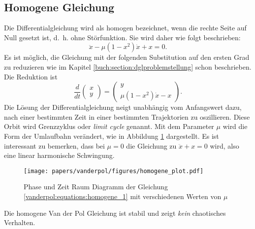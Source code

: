 \subsection{Homogene Gleichung
\label{vanderpol:subsection:homogene}}
%
Die Differentialgleichung wird als homogen bezeichnet, wenn die rechte Seite auf Null gesetzt ist, d.~h. ohne Störfunktion. Sie wird daher wie folgt beschrieben:
%
\begin{equation}
	\ddot{x} - \mu \left(1-x^{2}\right)\dot{x}+x = 0.
\label{vanderpol:equations:homogene}
\end{equation}
Es ist möglich, die Gleichung mit der folgenden Substitution auf den ersten Grad zu reduzieren wie im Kapitel \ref{buch:section:dglproblemstellung} schon beschrieben. Die Reduktion ist
%
\begin{equation}
\frac{d}{dt}\begin{pmatrix}x \\ y\end{pmatrix} = \begin{pmatrix}y \\ \mu \left(1-x^{2}\right)\dot{x}-x\end{pmatrix}.
\label{vanderpol:equations:homogene_1}
\end{equation}
Die Lösung der Differentialgleichung neigt unabhängig vom Anfangswert dazu, nach einer bestimmten Zeit in einer bestimmten Trajektorien zu oszillieren. Diese Orbit wird Grenzzyklus oder {\em limit cycle} genannt. Mit dem Parameter $\mu$ wird die Form der Umlaufbahn verändert, wie in Abbildung \ref{vanderpol:figures:homogene} dargestellt. Es ist interessant zu bemerken, dass bei $\mu = 0$ die Gleichung zu $\ddot{x} + x = 0$ wird, also eine linear harmonische Schwingung.
%
%
\begin{figure}
	\centering
	\texttt{[image: papers/vanderpol/figures/homogene\_plot.pdf]}
	\caption{Phase und Zeit Raum Diagramm der Gleichung \eqref{vanderpol:equations:homogene_1} mit verschiedenen Werten von $\mu$\label{vanderpol:figures:homogene}}
\end{figure}
Die homogene Van der Pol Gleichung ist stabil und zeigt {\em kein} chaotisches Verhalten.
